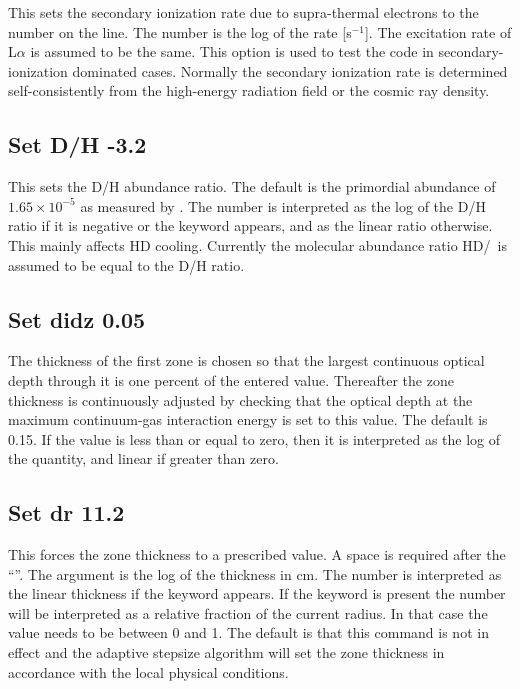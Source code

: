 This sets the secondary ionization rate due to supra-thermal electrons
to the number on the line.
The number is the log of the rate [s$^{-1}$].
The
excitation rate of L$\alpha $ is assumed to be the same.
This option is used to
test the code in secondary-ionization dominated cases.
Normally the
secondary ionization rate is determined self-consistently from the
high-energy radiation field or the cosmic ray density.

\subsection{Set D/H -3.2}

This sets the D/H abundance ratio.
The default is the primordial
abundance of $1.65 \times 10^{-5}$ as measured by \citet{Pettini2001}.  The number
is interpreted as the log of the D/H ratio if it is negative
or the keyword  appears, and as the linear
ratio otherwise.
This mainly affects HD
cooling.
Currently the molecular abundance ratio HD/\htwo\ is assumed to be
equal to the D/H ratio.

\subsection{Set didz 0.05 }

The thickness of the first zone is chosen so that the largest continuous
optical depth through it is one percent of the entered value.
Thereafter
the zone thickness is continuously adjusted by checking that the optical
depth at the maximum continuum-gas interaction energy is set to this value.
The default is 0.15.
If the value is less than or equal to zero, then it
is interpreted as the log of the quantity, and linear if greater than zero.

\subsection{Set dr 11.2}

This forces the zone thickness to a prescribed value.
A space is required after the ``''.
The argument is the log of the thickness in cm.
The number is interpreted as the linear thickness if the
keyword  appears.
If the keyword  is present the
number will be interpreted as a relative fraction of the current radius. In that
case the value needs to be between 0 and 1. The default is that this command
is not in effect and the adaptive stepsize algorithm will set the zone thickness
in accordance with the local physical conditions.

